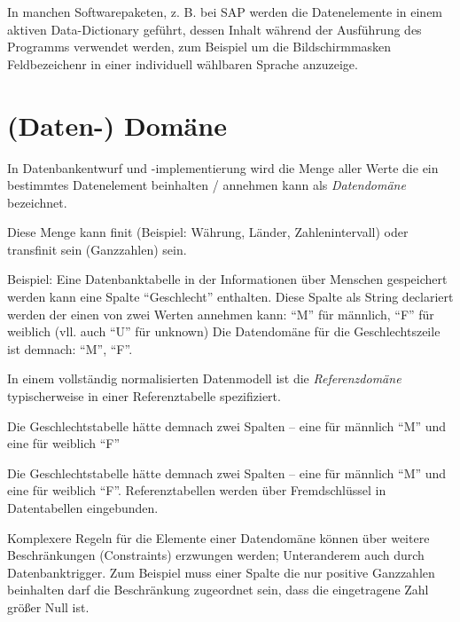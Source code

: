 \documentclass{scrbook}
\begin{document}
In manchen Softwarepaketen, z. B. bei SAP werden die Datenelemente in einem aktiven Data-Dictionary geführt,
dessen Inhalt während der Ausführung des Programms verwendet werden,
zum Beispiel um die Bildschirmmasken Feldbezeichenr in einer individuell wählbaren Sprache anzuzeige. 



\section{(Daten-) Domäne}

In Datenbankentwurf und -implementierung wird die Menge aller Werte die ein
bestimmtes Datenelement beinhalten / annehmen kann als \emph{Datendomäne}
bezeichnet.

Diese Menge kann finit (Beispiel: Währung, Länder, Zahlenintervall) oder transfinit sein (Ganzzahlen) sein.

Beispiel:
Eine Datenbanktabelle in der Informationen über Menschen gespeichert werden 
kann eine Spalte \enquote{Geschlecht} enthalten.
Diese Spalte als String declariert werden der einen von zwei Werten annehmen kann:
\enquote{M} für männlich, \enquote{F} für weiblich (vll. auch \enquote{U} für unknown)
Die Datendomäne für die Geschlechtszeile ist demnach: \enquote{M}, \enquote{F}.

In einem vollständig normalisierten Datenmodell ist die \emph{Referenzdomäne}
typischerweise in einer Referenztabelle spezifiziert.

Die Geschlechtstabelle hätte demnach zwei Spalten -- eine für männlich \enquote{M}
und eine für weiblich \enquote{F}

Die Geschlechtstabelle hätte demnach zwei Spalten -- eine für männlich \enquote{M}
und eine für weiblich \enquote{F}.
Referenztabellen werden über Fremdschlüssel in Datentabellen eingebunden.

Komplexere Regeln für die Elemente einer Datendomäne können über weitere
Beschränkungen (Constraints) erzwungen werden;
Unteranderem auch durch Datenbanktrigger.
Zum Beispiel muss einer Spalte die nur positive Ganzzahlen beinhalten darf
die Beschränkung zugeordnet sein, dass die eingetragene Zahl größer Null ist.
\end{document}
